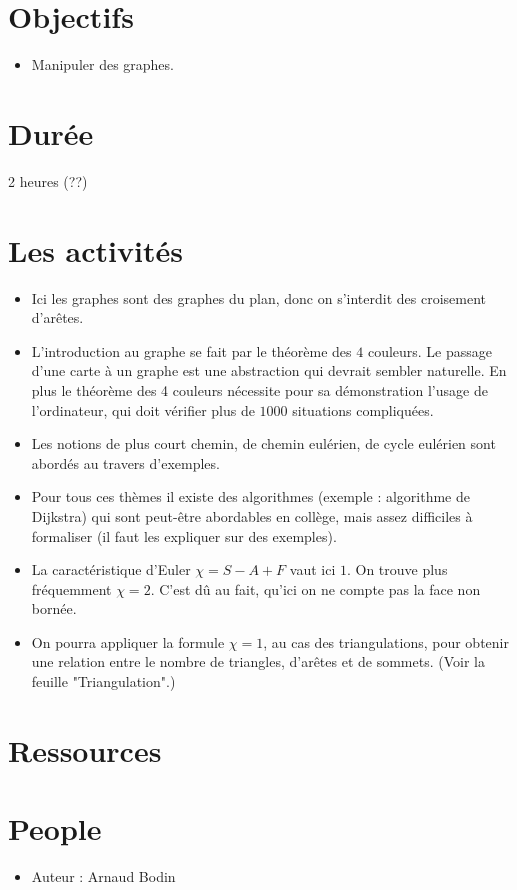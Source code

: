 \documentclass[class=report,crop=false, 12pt]{standalone}
\begin{document}



\section*{Objectifs}

\begin{itemize}
  \item Manipuler des graphes.
\end{itemize}


\section*{Durée}

2 heures (??)

\section*{Les activités}

\begin{itemize}
  \item Ici les graphes sont des graphes du plan, donc on s'interdit des croisement d'arêtes. 
  
  \item L'introduction au graphe se fait par le théorème des $4$ couleurs. Le passage d'une carte à un graphe est une abstraction qui devrait sembler naturelle.  En plus le théorème des 4 couleurs nécessite pour sa démonstration l'usage de l'ordinateur, qui doit vérifier plus de $1000$ situations compliquées. 
  \item Les notions de plus court chemin, de chemin eulérien, de cycle eulérien sont abordés au travers d'exemples. 
  \item Pour tous ces thèmes il existe des algorithmes (exemple : algorithme de Dijkstra) qui sont peut-être abordables en collège, mais assez difficiles à formaliser (il faut les expliquer sur des exemples).
  
  \item La caractéristique d'Euler $\chi = S-A+F$ vaut ici $1$. On trouve plus fréquemment $\chi=2$. C'est dû au fait, qu'ici on ne compte pas la face non bornée.
  
  \item On pourra appliquer la formule $\chi=1$, au cas des triangulations, pour obtenir une relation entre le nombre de triangles, d'arêtes et de sommets. (Voir la feuille "Triangulation".)
\end{itemize}


\section*{Ressources}


\section*{People}

\begin{itemize}
  \item Auteur : Arnaud Bodin
\end{itemize}
\end{document}
